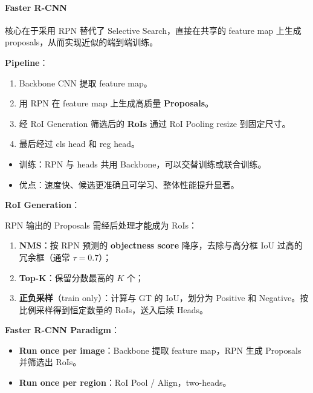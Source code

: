 \paragraph{Faster R-CNN}\label{faster-r-cnn}

核心在于采用 RPN 替代了 Selective Search，直接在共享的 feature map
上生成 proposals，从而实现近似的端到端训练。

\textbf{Pipeline}：

\begin{enumerate}
\def\labelenumi{\arabic{enumi}.}
\tightlist
\item
  Backbone CNN 提取 feature map。
\item
  用 RPN 在 feature map 上生成高质量 \textbf{Proposals}。
\item
  经 RoI Generation 筛选后的 \textbf{RoIs} 通过 RoI Pooling resize
  到固定尺寸。
\item
  最后经过 cls head 和 reg head。
\end{enumerate}

\begin{itemize}
\tightlist
\item
  训练：RPN 与 heads 共用 Backbone，可以交替训练或联合训练。
\item
  优点：速度快、候选更准确且可学习、整体性能提升显著。
\end{itemize}

\textbf{RoI Generation}：

RPN 输出的 Proposals 需经后处理才能成为 RoIs：

\begin{enumerate}
\def\labelenumi{\arabic{enumi}.}
\tightlist
\item
  \textbf{NMS}：按 RPN 预测的 \textbf{objectness score}
  降序，去除与高分框 IoU 过高的冗余框（通常 \(\tau=0.7\)）；
\item
  \textbf{Top-K}：保留分数最高的 \(K\) 个；
\item
  \textbf{正负采样}（train only）：计算与 GT 的 IoU，划分为 Positive 和
  Negative。按比例采样得到恒定数量的 RoIs，送入后续 Heads。
\end{enumerate}

\textbf{Faster R-CNN Paradigm}：

\begin{itemize}
\tightlist
\item
  \textbf{Run once per image}：Backbone 提取 feature map，RPN 生成
  Proposals 并筛选出 RoIs。
\item
  \textbf{Run once per region}：RoI Pool / Align，two-heads。
\end{itemize}

